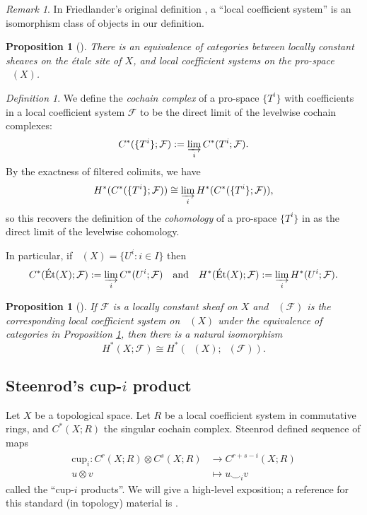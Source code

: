 \documentclass[10pt, reqno]{amsart}
\numberwithin{equation}{subsection}
\newcommand{\Cal}[1]{\mathcal{#1}}
\newcommand{\mrm}[1]{\mathrm{#1}}
\newcommand{\co}{\colon}
\DeclareMathOperator{\et}{\acute{e}t}
\DeclareMathOperator{\Et}{\acute{E}t}
\newtheorem{prop}[thm]{Proposition}
\theoremstyle{remark}
\newtheorem{remark}[thm]{Remark}
\newtheorem{defn}[thm]{Definition}
\begin{document}
\begin{remark}
In Friedlander's original definition \cite[\S 5, p. 48]{Fr82}, a ``local coefficient system'' is an isomorphism class of objects in our definition.
\end{remark}

\begin{prop}[{\cite[Corollary 5.8]{Fr82}}]\label{prop: bijection local systems} There is an equivalence of categories between locally constant sheaves on the \'{e}tale site of $X$, and local coefficient systems on the pro-space $\Et(X)$. 
\end{prop}

\begin{defn} 
We define the \emph{cochain complex} of a pro-space $\{T^i\}$ with coefficients in a local coefficient system $\Cal{F}$ to be the direct limit of the levelwise cochain complexes:
\[
C^*(\{T^i\}; \Cal{F}) := \varinjlim_i C^*(T^i; \Cal{F}).
\]
By the exactness of filtered colimits, we have 
\[
H^*(C^*(\{T^i\}; \Cal{F})) \cong \varinjlim_i H^*(C^*(\{T^i\}; \Cal{F})),
\]
so this recovers the definition of the \emph{cohomology} of a pro-space $\{T^i\}$ in \cite[Definition 5.1]{Fr82} as the direct limit of the levelwise cohomology.

 In particular, if $\Et(X)= \{U^i \co i \in I\}$ then
 \[
 C^*(\Et(X); \Cal{F}) := \varinjlim_i C^*(U^i; \Cal{F}) \quad
\text{and}  \quad  H^*(\Et(X); \Cal{F}) := \varinjlim_i H^*(U^i; \Cal{F}).
\]
\end{defn}

\begin{prop}[{\cite[Proposition 5.9]{Fr82}}] If $\Cal{F}$ is a locally constant sheaf on $X$ and $\Et(\Cal{F})$ is the corresponding local coefficient system on $\Et(X)$ under the equivalence of categories in Proposition \ref{prop: bijection local systems}, then there is a natural isomorphism
\[
H^*_{\et}(X; \Cal{F}) \cong H^*(\Et(X); \Et(\Cal{F})).
\]
\end{prop}

 
 
 
\subsection{Steenrod's cup-$i$ product}\label{subsec: cup-i}
 Let $X$ be a topological space. Let $R$ be a local coefficient system in commutative rings, and $C^*(X;R)$ the singular cochain complex. Steenrod defined sequence of maps 
\begin{align*}
\mrm{cup}_i \co C^r(X;R) \otimes C^s(X;R) &\rightarrow C^{r+s-i}(X;R) \\
u \otimes v & \mapsto u \smile_i v 
\end{align*}
called the ``cup-$i$ products''. We will give a high-level exposition; a reference for this standard (in topology) material is \cite[Chapter 2]{MoTan68}. 
\end{document}
